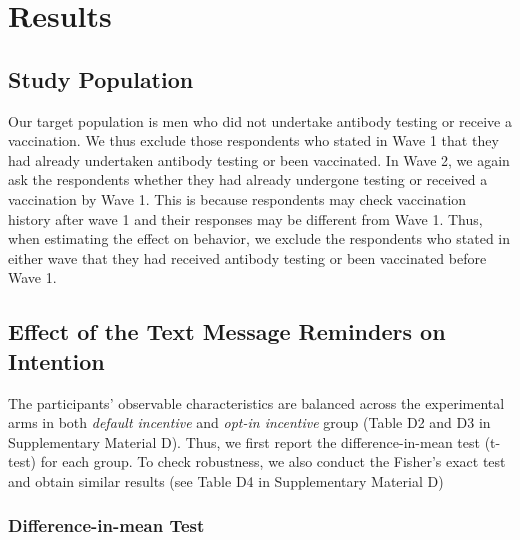 \documentclass[
  11pt,
  a4paper
]{article}
\begin{document}
\hypertarget{results}{%
\section{Results}\label{results}}

\hypertarget{sample}{%
\subsection{Study Population}\label{sample}}

Our target population is men who did not undertake antibody testing or receive a vaccination. We thus exclude those respondents who stated in Wave 1 that they had already undertaken antibody testing or been vaccinated. In Wave 2, we again ask the respondents whether they had already undergone testing or received a vaccination by Wave 1. This is because respondents may check vaccination history after wave 1 and their responses may be different from Wave 1. Thus, when estimating the effect on behavior, we exclude the respondents who stated in either wave that they had received antibody testing or been vaccinated before Wave 1.

\hypertarget{intention}{%
\subsection{Effect of the Text Message Reminders on Intention}\label{intention}}

The participants' observable characteristics are balanced across the experimental arms in both \emph{default incentive} and \emph{opt-in incentive} group (Table D2 and D3 in Supplementary Material D). Thus, we first report the difference-in-mean test (t-test) for each group. To check robustness, we also conduct the Fisher's exact test and obtain similar results (see Table D4 in Supplementary Material D)

\hypertarget{difference-in-mean-test}{%
\subsubsection{Difference-in-mean Test}\label{difference-in-mean-test}}
\end{document}

